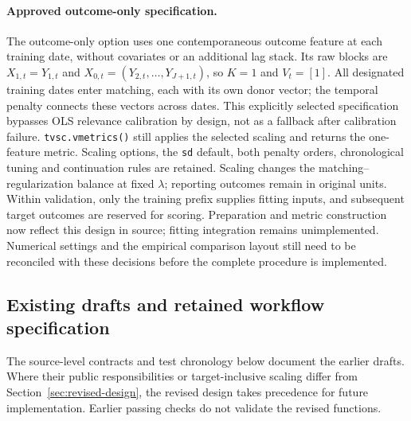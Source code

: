 \documentclass[11pt]{article}
\begin{document}
\paragraph{Approved outcome-only specification.}
The outcome-only option uses one contemporaneous outcome feature at each
training date, without covariates or an additional lag stack. Its raw
blocks are $X_{1,t}=Y_{1,t}$ and
$X_{0,t}=(Y_{2,t},\ldots,Y_{J+1,t})$, so $K=1$ and $V_t=[1]$.
All designated training dates enter matching, each with its own donor
vector; the temporal penalty connects these vectors across dates.
This explicitly selected specification bypasses OLS relevance calibration
by design, not as a fallback after calibration failure.
\texttt{tvsc.vmetrics()} still applies the selected scaling and returns
the one-feature metric. Scaling options, the \texttt{sd} default, both
penalty orders, chronological tuning and continuation rules are retained.
Scaling changes the matching--regularization balance at fixed $\lambda$;
reporting outcomes remain in original units. Within validation, only the
training prefix supplies fitting inputs, and subsequent target outcomes
are reserved for scoring. Preparation and metric construction now reflect
this design in source; fitting integration remains unimplemented.
Numerical settings and the empirical comparison layout still need to be
reconciled with these decisions before the complete procedure is implemented.

\subsection{Existing drafts and retained workflow specification}
The source-level contracts and test chronology below document the earlier
drafts. Where their public responsibilities or target-inclusive scaling
differ from Section~\ref{sec:revised-design}, the revised design takes
precedence for future implementation. Earlier passing checks do not
validate the revised functions.
\end{document}
